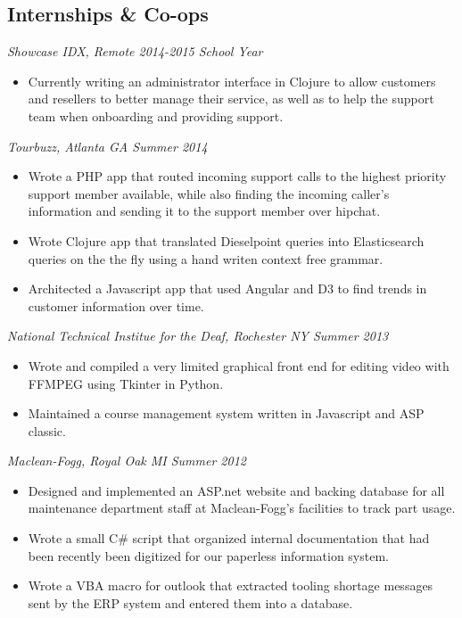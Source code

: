 \documentclass[line]{res}
\begin{document}
\begin{resume}
\begin{multicols}{2}
\columnbreak

\section{Internships \& Co-ops}
\textit{Showcase IDX, Remote \hfill{2014-2015 School Year}}
\begin{itemize}
    \item Currently writing an administrator interface in Clojure to allow customers and resellers to better 
          manage their service, as well as to help the support team when onboarding and providing support.
\end{itemize}

\textit{Tourbuzz, Atlanta GA \hfill{Summer 2014}}
\begin{itemize}
    \item Wrote a PHP app that routed incoming support calls to the highest priority support member available,
          while also finding the incoming caller's information and sending it to the support member over hipchat.
    \item Wrote Clojure app that translated Dieselpoint queries into Elasticsearch queries on the the fly 
          using a hand writen context free grammar.
    \item Architected a Javascript app that used Angular and D3 to find trends in customer information over time.
\end{itemize}

\textit{National Technical Institue for the Deaf, Rochester NY \hfill{Summer 2013}}
\begin{itemize}
    \item Wrote and compiled a very limited graphical front end for editing video with FFMPEG using Tkinter in Python.
    \item Maintained a course management system written in Javascript and ASP classic.
\end{itemize}

\textit{Maclean-Fogg, Royal Oak MI \hfill{Summer 2012}}
\begin{itemize}
    \item Designed and implemented an ASP.net website and backing database for all maintenance 
          department staff at Maclean-Fogg's facilities to track part usage.
    \item Wrote a small C\# script that organized internal documentation that had been recently been digitized for our 
          paperless information system.
    \item Wrote a VBA macro for outlook that extracted tooling shortage messages sent by the ERP system and 
          entered them into a database.
\end{itemize}
\end{multicols}
\end{resume}
\end{document}
